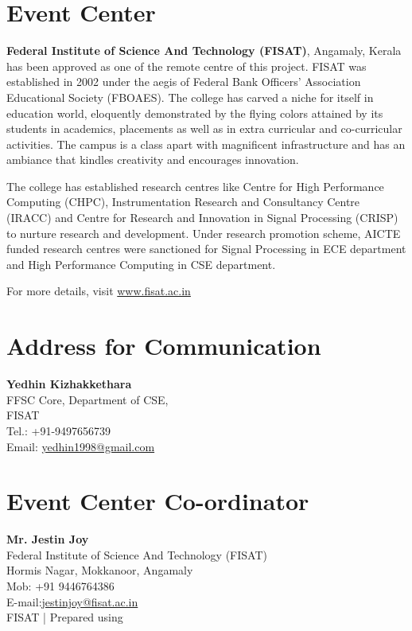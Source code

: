 \documentclass[notuble,10pt,a4paper]{leaflet}
\begin{document}
\section{{\Large Event Center}}
\textbf{Federal Institute of Science And Technology (FISAT)}, Angamaly, Kerala has been approved as one of the remote centre of this project. FISAT was established in 2002 under the aegis of Federal Bank Officers' Association Educational Society (FBOAES). The college has carved a niche for itself in education world, eloquently demonstrated by the flying colors attained by its students in academics, placements as well as in extra curricular and co-curricular activities. The campus is a class apart with magnificent infrastructure and has an ambiance that kindles creativity and encourages innovation.

The college has established research centres like Centre for High Performance Computing (CHPC), Instrumentation Research and Consultancy Centre (IRACC) and Centre for Research and Innovation in Signal Processing (CRISP) to nurture research and development. Under research promotion scheme, AICTE funded research centres were sanctioned for Signal Processing in ECE department and High Performance Computing in CSE department. 

For more details, visit \url{www.fisat.ac.in}

\section{{\Large Address for Communication}}
\textbf{Yedhin Kizhakkethara}\\
FFSC Core, Department of CSE,\\ 
FISAT\\
Tel.: +91-9497656739\\
Email:  \url{yedhin1998@gmail.com}

\section{{\Large Event Center Co-ordinator}}
\textbf{Mr. Jestin Joy}\\
Federal Institute of Science And Technology (FISAT)\\
Hormis Nagar, Mokkanoor, Angamaly\\
Mob: +91 9446764386\\
E-mail:\url{jestinjoy@fisat.ac.in}\\

\vfill
\footnotesize{\textcopyright FISAT | Prepared using \LaTeXe}



\end{document}
